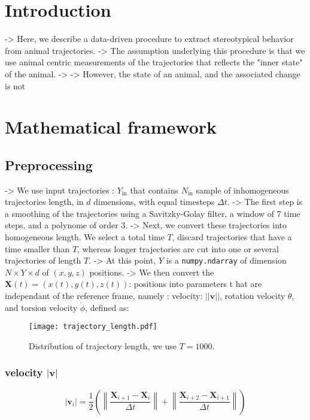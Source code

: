 \section{Introduction}

-> Here, we describe a data-driven procedure to extract stereotypical behavior from animal trajectories.
-> The assumption underlying this procedure is that we use animal centric measurements of the trajectories that reflects the "inner state" of the animal.
-> 
-> However, the state of an animal, and the associated change is not 

\section{Mathematical framework}

\subsection{Preprocessing}
-> We use input trajectories : $Y_\text{in}$ that contains $N_\text{in}$ sample of inhomogeneous trajectories length, in $d$ dimensions, with equal timesteps $\Delta t$.
-> The first step is a smoothing of the  trajectories using a Savitzky-Golay filter, a window of 7 time steps, and a polynome of order 3.
-> Next, we convert these trajectories into homogeneous length. We select a total time $T$, discard trajectories that have a time smaller than $T$, whereas longer trajectories are cut into one or several trajectories of length $T$.
-> At this point, $Y$ is a \texttt{numpy.ndarray} of dimension $N \times Y \times d$ of $(x,y,z)$ positions.
-> We then convert the  $\mathbf{X}(t) = (x(t), y(t), z(t))$: positions into parameters t hat are independant of the reference frame, namely : velocity: $||\textbf{v}||$, rotation velocity $\dot{\theta}$, and torsion velocity $\dot{\phi}$, defined as:
\begin{wrapfigure}[15]{r}{0.35\textwidth} %
  \centering
  \texttt{[image: trajectory\_length.pdf]} %
  \caption{Distribution of trajectory length, we use $T = 1000$.}
  \label{fig:phase_diagram}
\end{wrapfigure}
\subsubsection*{velocity $|\textbf{v}|$}
\begin{equation}
|\mathbf{v}_i| = \frac{1}{2} \left( \left\| \frac{\mathbf{X}_{i+1} - \mathbf{X}_i}{\Delta t} \right\| + \left\| \frac{\mathbf{X}_{i+2} - \mathbf{X}_{i+1}}{\Delta t} \right\| \right)
\end{equation}
